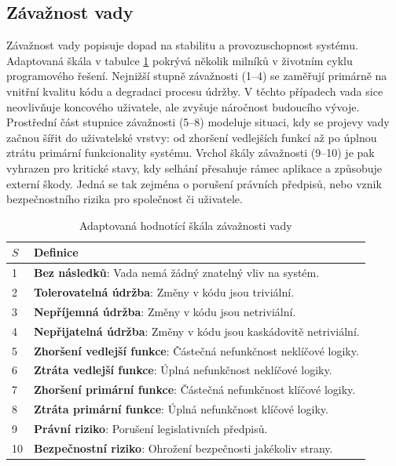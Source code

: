 \documentclass[FM,DP,fonts]{tulthesis}
\renewcommand{\arraystretch}{1.2}
\begin{document}
\subsection{Závažnost vady}
Závažnost vady popisuje dopad na stabilitu a provozuschopnost systému. Adaptovaná škála v tabulce \ref{table:severity} pokrývá několik milníků v životním cyklu programového řešení. Nejnižší stupně závažnosti (1–4) se zaměřují primárně na vnitřní kvalitu kódu a degradaci procesu údržby. V těchto případech vada sice neovlivňuje koncového uživatele, ale zvyšuje náročnost budoucího vývoje. Prostřední část stupnice závažnosti (5–8) modeluje situaci, kdy se projevy vady začnou šířit do uživatelské vrstvy: od zhoršení vedlejších funkcí až po úplnou ztrátu primární funkcionality systému. Vrchol škály závažnosti (9–10) je pak vyhrazen pro kritické stavy, kdy selhání přesahuje rámec aplikace a způsobuje externí škody. Jedná se tak zejména o porušení právních předpisů, nebo vznik bezpečnostního rizika pro společnost či uživatele.

\begin{table}[h]
	\centering
	\caption{Adaptovaná hodnotící škála závažnosti vady}
	\renewcommand{\arraystretch}{1.5}
	\label{table:severity}
	\begin{tabularx}{\textwidth}{|l|X|}
		\hline
		$S$ & \textbf{Definice}                                                         \\ \hline
		1   & \textbf{Bez následků}: Vada nemá žádný znatelný vliv na systém.           \\ \hline
		2   & \textbf{Tolerovatelná údržba}: Změny v kódu jsou triviální.               \\ \hline
		3   & \textbf{Nepříjemná údržba}: Změny v kódu jsou netriviální.                \\ \hline
		4   & \textbf{Nepřijatelná údržba}: Změny v kódu jsou kaskádovitě netriviální.  \\ \hline
		5   & \textbf{Zhoršení vedlejší funkce}: Částečná nefunkčnost neklíčové logiky. \\ \hline
		6   & \textbf{Ztráta vedlejší funkce}: Úplná nefunkčnost neklíčové logiky.      \\ \hline
		7   & \textbf{Zhoršení primární funkce}: Částečná nefunkčnost klíčové logiky.   \\ \hline
		8   & \textbf{Ztráta primární funkce}: Úplná nefunkčnost klíčové logiky.        \\ \hline
		9   & \textbf{Právní riziko}: Porušení legislativních předpisů.                 \\ \hline
		10  & \textbf{Bezpečnostní riziko}: Ohrožení bezpečnosti jakékoliv strany.      \\ \hline
	\end{tabularx}
\end{table}
\end{document}
